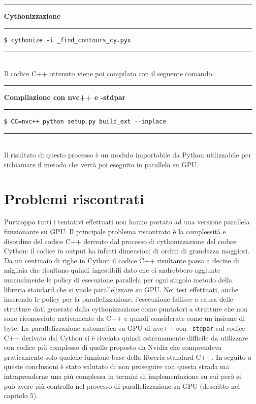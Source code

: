 \documentclass[12pt,a4paper]{report}
\begin{document}
\noindent\rule[0.5ex]{\linewidth}{2pt}
\small{\textbf{Cythonizzazione}} \\
\noindent\rule[0.5ex]{\linewidth}{1pt}
\begin{lstlisting}
$ cythonize -i _find_contours_cy.pyx
\end{lstlisting}
\noindent\rule[0.5ex]{\linewidth}{1pt} \\[8pt]
Il codice C++ ottenuto viene poi compilato con il seguente comando.\\[8pt]
\noindent\rule[0.5ex]{\linewidth}{2pt}
\small{\textbf{Compilazione con nvc++ e -stdpar}} \\
\noindent\rule[0.5ex]{\linewidth}{1pt}
\begin{lstlisting}
$ CC=nvc++ python setup.py build_ext --inplace
\end{lstlisting}
\noindent\rule[0.5ex]{\linewidth}{1pt} \\[10pt]
Il risultato di questo processo è un modulo importabile da Python utilizzabile per richiamare il metodo che verrà poi eseguito in parallelo su GPU. \newline 

\section{Problemi riscontrati}
Purtroppo tutti i tentativi effettuati non hanno portato ad una versione parallela funzionante su GPU. Il principale problema riscontrato è la complessità e disordine del codice C++ derivato dal processo di cythonizzazione del codice Cython: il codice in output ha infatti dimensioni di ordini di grandezza maggiori. Da un centinaio di righe in Cython il codice C++ risultante passa a decine di migliaia che risultano quindi ingestibili dato che ci andrebbero aggiunte manualmente le policy di esecuzione parallela per ogni singolo metodo della libreria standard che si vuole parallelizzare su GPU. Nei test effettuati, anche inserendo le policy per la parallelizzazione, l'esecuzione fallisce a causa delle strutture dati generate dalla cythonizzazione come puntatori a strutture che non sono riconosciute nativamente da C++ e quindi considerate come un insieme di byte. La parallelizzazione automatica su GPU di nvc++ con \verb|-stdpar| sul codice C++ derivato dal Cython si è rivelata quindi estremamente difficile da utilizzare con codice più complesso di quello proposto da Nvidia che comprendeva praticamente solo qualche funzione base della libreria standard C++. 
In seguito a queste conclusioni è stato valutato di non proseguire con questa strada ma intraprenderne una più complessa in termini di implementazione su cui però si può avere più controllo nel processo di parallelizzazione su GPU (descritto nel capitolo 5).
\end{document}

